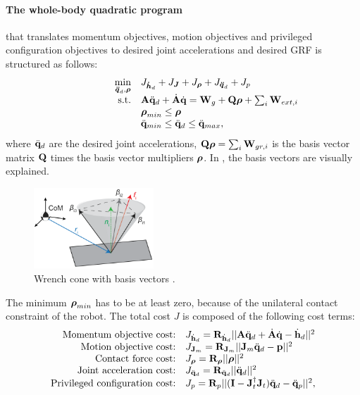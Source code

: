 \paragraph{The whole-body quadratic program} \cite{koolen2016design} that translates momentum objectives, motion objectives and privileged configuration objectives to desired joint accelerations and desired \ac{GRF} is structured as follows:
\begin{equation}
\begin{array}{rlcl}
\displaystyle \min_{\bs{\ddot{q}}_d,\bs{\rho}} & \multicolumn{3}{l}{J_{\bs{\dot{h}}_d} + J_{\bs{J}} + J_{\bs{\rho}} + J_{\bs{\ddot{q}}_d}  + J_p} \\
\textrm{s.t.} & \matr{A}\ddqjntd + \dot{\matr{A}}\dqjnt = \matr{W}_g + \matr{Q}\bs{\rho}+\sum_i\matr{W}_{ext,i}\\
&\displaystyle \bs{\rho}_{min} \leq \bs{\rho}\\
&\ddot{\qjnt}_{min} \leq \ddqjntd \leq \ddot{\qjnt}_{max},
\end{array}
\end{equation}
where $\ddot{\mathbf{q}}_d$ are the desired joint accelerations, $\mathbf{Q}\boldsymbol{\rho} = \sum_i\mathbf{W}_{gr,i}$ is the basis vector matrix $\mathbf{Q}$ times the basis vector multipliers $\boldsymbol{\rho}$. In , the basis vectors are visually explained.  
\begin{figure}[h]
\centering
\includegraphics[width=0.4\textwidth]{STYLESTUFF/wrenchcone.png}
\caption{Wrench cone with basis vectors \cite{koolen2016design}. }
\label{fig:wrenchcone}
\end{figure}
The minimum $\boldsymbol{\rho}_{min}$ has to be at least zero, because of the unilateral contact constraint of the robot. The total cost $J$ is composed of the following cost terms:
\begin{equation*}
\begin{array}{rlcl}
$Momentum objective cost:$ & J_{\dot{\vect{h}}_d}= \wght_{\dot{\vect{h}}_d}||\matr{A}\ddqjntd + \dot{\matr{A}}\dqjnt - \dot{\vect{h}}_d||^2\\
$Motion objective cost:$ & J_{\matr{J}_m} = \wght_{\matr{J}_m}||\matr{J}_m\ddqjntd-\vect{p}||^2\\
$Contact force cost:$ & J_{\bs{\rho}}=\wght_{\bs{\rho}}||\bs{\rho}||^2 \\
$Joint acceleration cost:$ & J_{\ddqjntd} = \wght_{\ddqjntd}||\ddqjntd ||^2 \\
$Privileged configuration cost:$ & J_p = \wght_p||(\matr{I} - \matr{J}_t^{\dagger}\matr{J}_t)\ddqjntd - \ddqjntp||^2,
\end{array}
\end{equation*}
